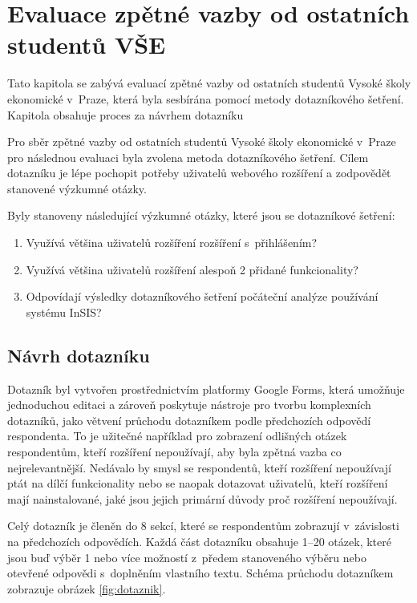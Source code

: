 \chapter{Evaluace zpětné vazby od ostatních studentů VŠE}\label{chap:zpetna-vazba}

Tato kapitola se zabývá evaluací zpětné vazby od ostatních studentů Vysoké školy ekonomické v~Praze, která byla sesbírána pomocí metody dotazníkového šetření. Kapitola obsahuje proces za návrhem dotazníku

Pro sběr zpětné vazby od ostatních studentů Vysoké školy ekonomické v~Praze pro následnou evaluaci byla zvolena metoda dotazníkového šetření. Cílem dotazníku je lépe pochopit potřeby uživatelů webového rozšíření a zodpovědět stanovené výzkumné otázky.

Byly stanoveny následující výzkumné otázky, které jsou se dotazníkové šetření:

\begin{enumerate}
    \item Využívá většina uživatelů rozšíření rozšíření s~přihlášením?
    \item Využívá většina uživatelů rozšíření alespoň 2 přidané funkcionality?
    \item Odpovídají výsledky dotazníkového šetření počáteční analýze používání systému InSIS?
\end{enumerate}

\section{Návrh dotazníku}

Dotazník byl vytvořen prostřednictvím platformy Google Forms, která umožňuje jednoduchou editaci a zároveň poskytuje nástroje pro tvorbu komplexních dotazníků, jako větvení průchodu dotazníkem podle předchozích odpovědí respondenta. To je užitečné například pro zobrazení odlišných otázek respondentům, kteří rozšíření nepoužívají, aby byla zpětná vazba co nejrelevantnější. Nedávalo by smysl se respondentů, kteří rozšíření nepoužívají ptát na dílčí funkcionality nebo se naopak dotazovat uživatelů, kteří rozšíření mají nainstalované, jaké jsou jejich primární důvody proč rozšíření nepoužívají. 

Celý dotazník je členěn do 8 sekcí, které se respondentům zobrazují v~závislosti na předchozích odpovědích. Každá část dotazníku obsahuje 1--20 otázek, které jsou buď výběr 1 nebo více možností z~předem stanoveného výběru nebo otevřené odpovědi s~doplněním vlastního textu. Schéma průchodu dotazníkem zobrazuje obrázek \ref{fig:dotaznik}.

